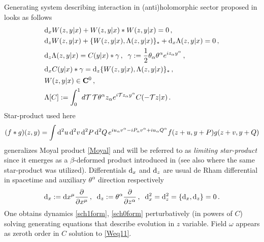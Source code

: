 \documentclass[12pt]{article}
\newcommand{\dr}{{{\rm d}}}
\newcommand{\gga}{\gamma}
\newcommand{\half}{\frac{1}{2}}
\begin{document}
Generating system describing interaction in (anti)holomorphic sector proposed in \cite{Didenko:2022qga} looks as follows
\begin{align}
&\dr_{x} W(z,y|x)+W(z,y|x)*W(z,y|x)=0\,,\label{dxWeq1}\\
&\dr_z W(z,y|x)+\{W(z,y|x),\Lambda(z,y|x)\}_{*}+\dr_x\Lambda(z,y|x)=0\,,\label{Weq11}\\
&\dr_z\Lambda(z,y|x)=C(y|x)*\gga\,,\;\; \gamma:=\half\theta_\alpha\theta^\alpha e^{iz_\alpha y^\alpha}\,,\label{Lambdaeq1}\\
&\dr_x C(y|x)*\gga=\dr_z\{W(z,y|x),\Lambda(z,y|x)\}_{*}\,,\label{Ceq1}\\
&W(z,y|x)\in \mathbf{C}^0\, , \label{class1}\\
&\Lambda[C]:= \int_0^1 d\mathcal{T}\, \mathcal{T} \theta^\alpha z_\alpha e^{i\mathcal{T}z_\alpha y^\alpha}C(-\mathcal{T}z|x)\,. \label{LambdaDef}
\end{align}
Star-product used here 
\begin{equation}\label{star_infty}
(f\ast g)(z,y)
= \int \dr^2 u\,\dr^2 v \, \dr^2 P\, \dr^2Q\, e^{iu_\alpha v^\alpha -iP_\alpha v^\alpha+iu_\alpha Q^\alpha}f(z+u,y+P)g(z+v,y+Q)
\end{equation} 
generalizes Moyal product \eqref{Moyal} and will be referred to as {\it limiting star-product} since it emerges as a $\beta$-deformed product introduced in \cite{Didenko:2019xzz} (see also \cite{Sharapov:2022awp} where the same star-product was utilized). Differentials $\dr_x$ and $\dr_z$ are usual de Rham differential in spacetime and auxiliary $\theta^\alpha$ direction respectively
\begin{equation}
\dr_x:=\dr x^\mu \frac{\partial}{\partial x^\mu}\,,\;\; \dr_z:=\theta^\alpha \frac{\partial}{\partial z^\alpha}\,,\;\; \dr_x^2=\dr_z^2=\{\dr_x,\dr_z\}=0\,.
\end{equation}
One obtains dynamics \eqref{sch1form}, \eqref{sch0form} perturbatively (in powers of $C$) solving generating equations that describe evolution in $z$ variable. Field $\omega$ appears as zeroth order in $C$ solution to \eqref{Weq11}.
\end{document}
